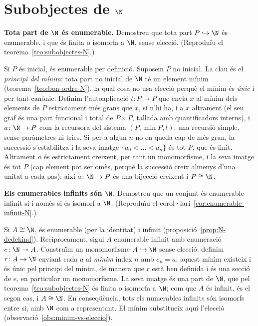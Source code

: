 \section{Subobjectes de \texorpdfstring{\(\N\)}{N}}\label{prac:subobjectes}

\begin{exercici}
\textbf{Tota part de \(\N\) és enumerable.} Demostreu que tota part \(P\hookrightarrow\N\) és enumerable, i que és finita o isomorfa a \(\N\), sense elecció. (Reproduïu el teorema~\ref{teo:subobjectes-N}.)
\end{exercici}
\begin{solucio}
Si \(P\) és inicial, és enumerable per definició. Suposem \(P\) no inicial. La clau és el \emph{principi del mínim}: tota part no inicial de \(\N\) té un element mínim (teorema~\ref{teo:bon-ordre-N}), la qual cosa no usa elecció perquè el mínim és \emph{únic} i per tant canònic. Definim l'autoaplicació \(t\colon P\to P\) que envia \(x\) al mínim dels elements de \(P\) estrictament més grans que \(x\), si n'hi ha, i a \(x\) altrament (el seu graf és una part funcional i total de \(P\times P\), tallada amb quantificadors interns), i \(a\colon\N\to P\) com la recursora del sistema \((P,\min P,t)\): una recursió simple, sense paràmetres ni tries. Si per a algun \(n\) no en queda cap de més gran, la successió s'estabilitza i la seva imatge \(\{a_0<\dots<a_n\}\) és tot \(P\), que és finit. Altrament \(a\) és estrictament creixent, per tant un monomorfisme, i la seva imatge és tot \(P\) (cap element pot ser omès, perquè la successió creix almenys d'una unitat a cada pas); així \(a\colon\N\to P\) és una bijecció creixent i \(P\cong\N\).
\end{solucio}

\begin{exercici}
\textbf{Els enumerables infinits són \(\N\).} Demostreu que un conjunt és enumerable infinit si i només si és isomorf a \(\N\). (Reproduïu el corol·lari~\ref{cor:enumerable-infinit-N}.)
\end{exercici}
\begin{solucio}
Si \(A\cong\N\), és enumerable (per la identitat) i infinit (proposició~\ref{prop:N-dedekind}). Recíprocament, sigui \(A\) enumerable infinit amb enumeració \(e\colon\N\twoheadrightarrow A\). Construïm un monomorfisme \(A\hookrightarrow\N\) sense elecció: definim \(r\colon A\to\N\) enviant cada \(a\) al \emph{mínim} índex \(n\) amb \(e_n=a\); aquest mínim existeix i és únic pel principi del mínim, de manera que \(r\) està ben definida i és una secció de \(e\), en particular un monomorfisme. La seva imatge és una part de \(\N\), que pel teorema~\ref{teo:subobjectes-N} és finita o isomorfa a \(\N\); com que \(A\) és infinit, és el segon cas, i \(A\cong\N\). En conseqüència, tots els numerables infinits són isomorfs entre si, amb \(\N\) com a representant. El mínim substitueix aquí l'elecció (observació~\ref{obs:minim-vs-eleccio}).
\end{solucio}


